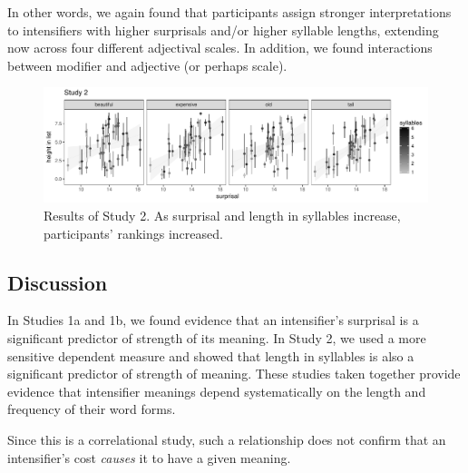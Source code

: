 \documentclass[10pt,letterpaper]{article}
\begin{document}
In other words, we again found that participants assign stronger interpretations to intensifiers with higher surprisals and/or higher syllable lengths, extending now across four different adjectival scales.
In addition, we found interactions between modifier and adjective (or perhaps scale).

\begin{figure}[hbt]
\begin{center}
\includegraphics[width=\textwidth]{images/plot_study2.pdf}
\end{center}
\caption{Results of Study 2. As surprisal and length in syllables increase, participants' rankings increased.} 
\label{fig:plot_study2}
\end{figure}

\subsection{Discussion}

In Studies 1a and 1b, we found evidence that an intensifier's surprisal is a significant predictor of strength of its meaning. In Study 2, we used a more sensitive dependent measure and showed that length in syllables is also a significant predictor of strength of meaning.
These studies taken together provide evidence that intensifier meanings depend systematically on the length and frequency of their word forms.


Since this is a correlational study, such a relationship does not confirm that an intensifier's cost \emph{causes} it to have a given meaning.
\end{document}
